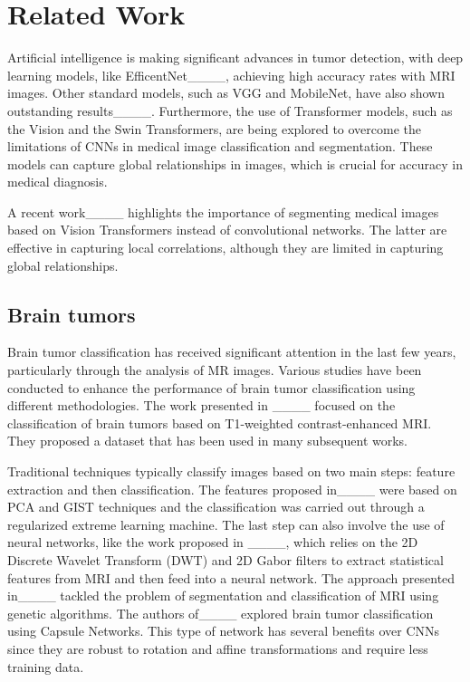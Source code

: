 \section{Related Work}
\label{se:relate_work}

Artificial intelligence is making significant advances in tumor detection, with deep learning models, like EfficentNet____, achieving high accuracy rates with MRI images. Other standard models, such as VGG and MobileNet, have also shown outstanding results____. Furthermore, the use of Transformer models, such as the Vision and the Swin Transformers, are being explored to overcome the limitations of CNNs in medical image classification and segmentation. These models can capture global relationships in images, which is crucial for accuracy in medical diagnosis.

A recent work____ highlights the importance of segmenting medical images based on Vision Transformers instead of convolutional networks. The latter are effective in capturing local correlations, although they are limited in capturing global relationships. 

\subsection{Brain tumors}
Brain tumor classification has received significant attention in the last few years, particularly through the analysis of MR images. Various studies have been conducted to enhance the performance of brain tumor classification using different methodologies. The work presented in ____ focused on the classification of brain tumors based on T1-weighted contrast-enhanced MRI. They proposed a dataset that has been used in many subsequent works.  

Traditional techniques typically classify images based on two main steps: feature extraction and then classification. The features proposed in____ were based on PCA and GIST techniques and the classification was carried out through a regularized extreme learning machine. The last step can also involve the use of neural networks, like the work proposed in ____, which relies on the 2D Discrete Wavelet Transform (DWT) and 2D Gabor filters to extract statistical features from MRI and then feed into a neural network. The approach presented in____ tackled the problem of segmentation and classification of MRI using genetic algorithms. The authors of____ explored brain tumor classification using Capsule Networks. This type of network has several benefits over CNNs since they are robust to rotation and affine transformations and require less training data.

